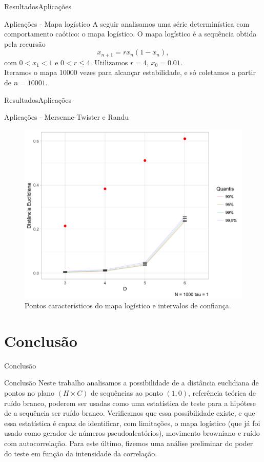 \documentclass[10pt,xcolor={dvipsnames}]{beamer}
\begin{document}
\begin{frame}{Resultados}{Aplicações}
	\begin{block}{Aplicações - Mapa logístico}
	A seguir analisamos uma série determinística com comportamento caótico: o mapa logístico.
	O mapa logístico é a sequência obtida pela recursão
	\begin{equation}
	x_{n+1} = r x_n(1-x_n),
	\end{equation}
	com $0<x_1<1$ e $0<r\leq 4$.
	Utilizamos $r=4$, $x_0=0.01$.\\
	Iteramos o mapa \num{10000} vezes para alcançar estabilidade, e só coletamos a partir de $n=10001$.	
	\end{block}
\end{frame}

\begin{frame}{Resultados}{Aplicações}
	\begin{block}{Aplicações - Mersenne-Twister e Randu}
	\begin{figure}
		\centering
		\includegraphics[width=.65\linewidth]{ConfidInt_mapa_logistico_1k_t1}
		\caption{Pontos característicos do mapa logístico e intervalos de confiança.}\label{Fig:ConfidInt_mapa_logistico_1k_t1}
	\end{figure}
	\end{block}
\end{frame}

\section{Conclusão}

\begin{frame}{Conclusão}{}
	\begin{block}{Conclusão}
		Neste trabalho analisamos a possibilidade de a distância euclidiana de pontos no plano $(H\times C)$ de sequências ao ponto $(1,0)$, referência teórica de ruído branco, poderem ser usadas como uma estatística de teste para a hipótese de a sequência ser ruído branco.
		Verificamos que essa possibilidade existe, e que essa estatística é capaz de identificar, com limitações, o mapa logístico (que já foi usado como gerador de números pseudoaleatórios), movimento browniano e ruído com autocorrelação.
		Para este último, fizemos uma análise preliminar do poder do teste em função da intensidade da correlação.
	\end{block}
\end{frame}
\end{document}
